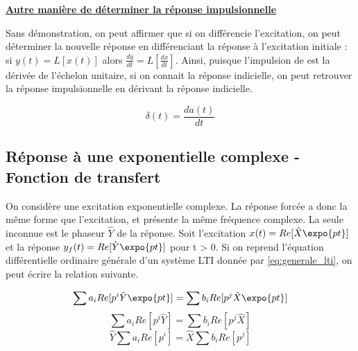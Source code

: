 	\vspace{0.5\baselineskip}
	
	\textbf{\underline{Autre manière de déterminer la réponse
            impulsionnelle}}
	
	Sans démonstration, on peut affirmer que si on différencie
        l'excitation, on peut déterminer la nouvelle réponse en
        différenciant la réponse à l'excitation initiale : si
        $y(t) = L[x(t)]$ alors $\frac{dy}{dt} = L[\frac{dx}{dt}] $.
        Ainsi, puisque l'impulsion de \Dirac{} est la dérivée de
        l'échelon unitaire, si on connait la réponse indicielle, on
        peut retrouver la réponse impulsionnelle en dérivant la
        réponse indicielle.
	
	\begin{equation}\label{key}
          \delta(t)=\frac{da(t)}{dt}
	\end{equation}
	
	\vspace{0.5\baselineskip}
	
	
	\subsection{Réponse à une exponentielle complexe - Fonction de transfert}
	On considère une excitation exponentielle complexe. La réponse
        forcée a donc la même forme que l'excitation, et présente la
        même fréquence complexe. La seule inconnue est le phaseur
        $\hat{Y}$ de la réponse. Soit l'excitation
        $ x(t) = Re[\hat{X}  \expo{pt}]$ et la réponse
        $ y_{f}(t) = Re[\hat{Y}  \expo{pt}]$ pour t > 0. Si on
        reprend l'équation différentielle ordinaire générale d'un
        système LTI donnée par \ref{eq:generale_lti}, on peut
        écrire la relation suivante.
	
	\begin{equation*}\label{}
          \sum a_{i}  Re[p^{i}  \hat{Y}  \expo{pt}] = \sum b_{i}  Re[p^{j}  \hat{X}  \expo{pt}]
	\end{equation*}
	\begin{equation*}\label{}
          \sum a_{i}  Re[p^{i}  \hat{Y}] = \sum b_{i}  Re[p^{j}  \hat{X}]
	\end{equation*}
	\begin{equation*}\label{}
          \hat{Y}  \sum a_{i}  Re[p^{i}] = \hat{X}  \sum b_{i}  Re[p^{j}]
	\end{equation*}
	
